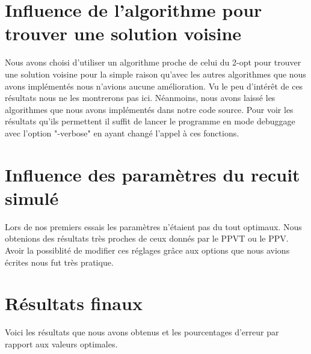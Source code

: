 \documentclass{article}
\begin{document}
\section{Influence de l'algorithme pour trouver une solution voisine}

Nous avons choisi d'utiliser un algorithme proche de celui du 2-opt pour trouver une solution voisine pour la simple raison qu'avec les autres algorithmes que nous avons implémentés nous n'avions aucune amélioration.
Vu le peu d'intérêt de ces résultats nous ne les montrerons pas ici.
Néanmoins, nous avons laissé les algorithmes que nous avons implémentés dans notre code source.
Pour voir les résultats qu'ils permettent il suffit de lancer le programme en mode debuggage avec l'option "-verbose" en ayant changé l'appel à ces fonctions.

\section{Influence des paramètres du recuit simulé}

Lors de nos premiers essais les paramètres n'étaient pas du tout optimaux.
Nous obtenions des résultats très proches de ceux donnés par le PPVT ou le PPV.
Avoir la possiblité de modifier ces réglages grâce aux options que nous avions écrites nous fut très pratique.

\section{Résultats finaux}

Voici les résultats que nous avons obtenus et les pourcentages d'erreur par rapport aux valeurs optimales.
\end{document}
